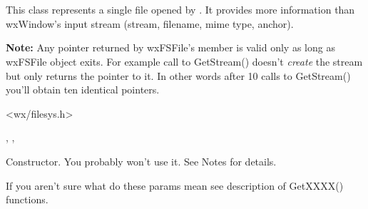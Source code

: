 %
%

\section{}\label{wxfsfile}

This class represents a single file opened by .
It provides more information than wxWindow's input stream 
(stream, filename, mime type, anchor).

{\bf Note:} Any pointer returned by wxFSFile's member is valid
only as long as wxFSFile object exits. For example call to GetStream()
doesn't {\it create} the stream but only returns the pointer to it. In
other words after 10 calls to GetStream() you'll obtain ten identical
pointers.




<wx/filesys.h>


, 
,


\label{wxfsfilewxfsfile}


Constructor. You probably won't use it. See Notes for details.






If you aren't sure what do these params mean see description of GetXXXX()
functions.


